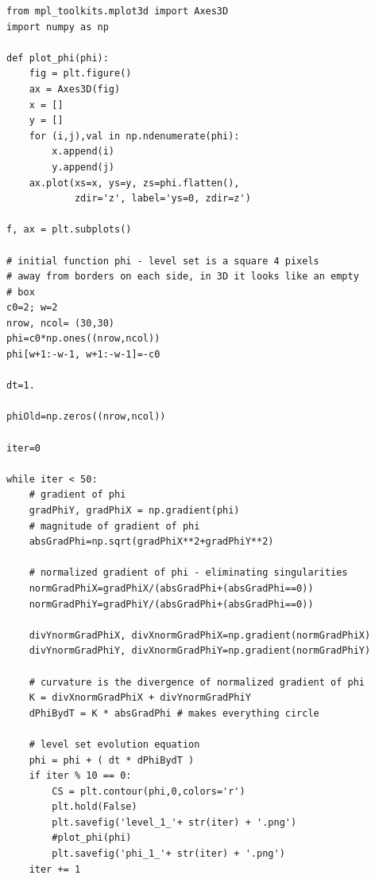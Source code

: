 \documentclass[12pt,fleqn]{article}\usepackage{../../common}
\begin{document}
\begin{verbatim}
from mpl_toolkits.mplot3d import Axes3D
import numpy as np

def plot_phi(phi):
    fig = plt.figure()
    ax = Axes3D(fig)
    x = []
    y = []
    for (i,j),val in np.ndenumerate(phi):
        x.append(i)
        y.append(j)
    ax.plot(xs=x, ys=y, zs=phi.flatten(), 
            zdir='z', label='ys=0, zdir=z')

f, ax = plt.subplots()

# initial function phi - level set is a square 4 pixels
# away from borders on each side, in 3D it looks like an empty
# box
c0=2; w=2
nrow, ncol= (30,30)
phi=c0*np.ones((nrow,ncol))
phi[w+1:-w-1, w+1:-w-1]=-c0

dt=1.

phiOld=np.zeros((nrow,ncol))

iter=0

while iter < 50:
    # gradient of phi
    gradPhiY, gradPhiX = np.gradient(phi)
    # magnitude of gradient of phi
    absGradPhi=np.sqrt(gradPhiX**2+gradPhiY**2)                               
    
    # normalized gradient of phi - eliminating singularities
    normGradPhiX=gradPhiX/(absGradPhi+(absGradPhi==0))
    normGradPhiY=gradPhiY/(absGradPhi+(absGradPhi==0))
    
    divYnormGradPhiX, divXnormGradPhiX=np.gradient(normGradPhiX)
    divYnormGradPhiY, divXnormGradPhiY=np.gradient(normGradPhiY)
                           
    # curvature is the divergence of normalized gradient of phi
    K = divXnormGradPhiX + divYnormGradPhiY
    dPhiBydT = K * absGradPhi # makes everything circle
    
    # level set evolution equation    
    phi = phi + ( dt * dPhiBydT )
    if iter % 10 == 0: 
        CS = plt.contour(phi,0,colors='r')
        plt.hold(False)
        plt.savefig('level_1_'+ str(iter) + '.png')
        #plot_phi(phi)
        plt.savefig('phi_1_'+ str(iter) + '.png')
    iter += 1
\end{verbatim}
\end{document}
